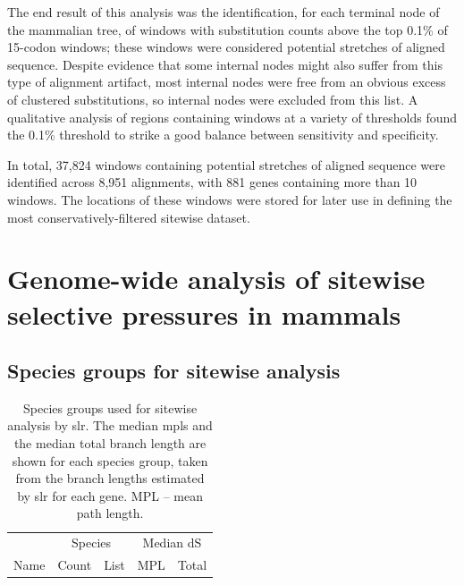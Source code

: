 
The end result of this analysis was the identification, for each
terminal node of the mammalian tree, of windows with \nsyn
substitution counts above the top 0.1\% of 15-codon windows; these
windows were considered potential stretches of \nhom aligned
sequence. Despite evidence that some internal nodes might also suffer
from this type of alignment artifact, most internal nodes were free
from an obvious excess of clustered \nsyn substitutions, so internal
nodes were excluded from this list. A qualitative analysis of regions
containing windows at a variety of thresholds found the 0.1\%
threshold to strike a good balance between sensitivity and
specificity.

In total, 37,824 windows containing potential stretches of \nhom
aligned sequence were identified across 8,951 alignments, with 881
genes containing more than 10 windows. The locations of these windows
were stored for later use in defining the most conservatively-filtered
sitewise dataset.

\section{Genome-wide analysis of sitewise selective pressures in mammals}

\subsection{Species groups for sitewise analysis}

\begin{table}
\centering \footnotesize
\begin{tabular}{lrb{8cm}rr}
\toprule
 & \multicolumn{2}{c}{Species} & \multicolumn{2}{c}{Median dS} \\
\cmidrule(r){2-3} \cmidrule{4-5}
Name & Count & List & MPL & Total \\
  \midrule

\bottomrule
\end{tabular}
\caption{Species groups used for sitewise analysis by \ac{slr}. The
  median \acp{mpl} and the median total branch length are shown for
  each species group, taken from the \ntrees branch lengths estimated
  by \ac{slr} for each gene. MPL -- mean path length.}
\label{table_species_set_summary}
\end{table}

